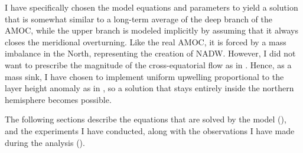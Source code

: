 I have specifically chosen the model equations and parameters to yield a solution that is somewhat similar to a long-term average of the deep branch of the \acs{AMOC}, while the upper branch is modeled implicitly by assuming that it always closes the meridional overturning. Like the real \ac{AMOC}, it is forced by a mass imbalance in the North, representing the creation of \ac{NADW}. However, I did not want to prescribe the magnitude of the cross-equatorial flow as in \eg \cite{edwards}. Hence, as a mass sink, I have chosen to implement uniform upwelling proportional to the layer height anomaly as in \cite{kawase}, so a solution that stays entirely inside the northern hemisphere becomes possible.

The following sections describe the equations that are solved by the model (), and the experiments I have conducted, along with the observations I have made during the analysis ().


